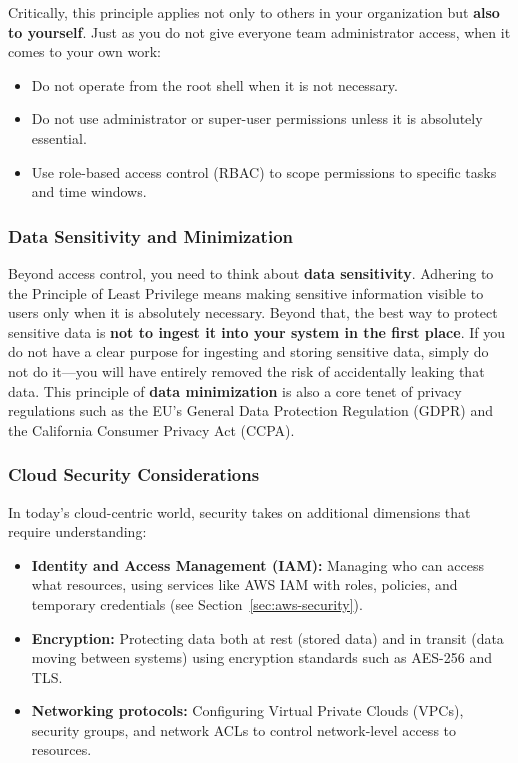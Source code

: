 \documentclass{article}
\begin{document}
Critically, this principle applies not only to others in your organization but \textbf{also to yourself}. Just as you do not give everyone team administrator access, when it comes to your own work:
\begin{itemize}
    \item Do not operate from the root shell when it is not necessary.
    \item Do not use administrator or super-user permissions unless it is absolutely essential.
    \item Use role-based access control (RBAC) to scope permissions to specific tasks and time windows.
\end{itemize}

\subsubsection{Data Sensitivity and Minimization}
Beyond access control, you need to think about \textbf{data sensitivity}. Adhering to the Principle of Least Privilege means making sensitive information visible to users only when it is absolutely necessary. Beyond that, the best way to protect sensitive data is \textbf{not to ingest it into your system in the first place}. If you do not have a clear purpose for ingesting and storing sensitive data, simply do not do it---you will have entirely removed the risk of accidentally leaking that data. This principle of \textbf{data minimization} is also a core tenet of privacy regulations such as the EU's General Data Protection Regulation (GDPR) \cite{gdpr2016} and the California Consumer Privacy Act (CCPA).

\subsubsection{Cloud Security Considerations}
In today's cloud-centric world, security takes on additional dimensions that require understanding:
\begin{itemize}
    \item \textbf{Identity and Access Management (IAM):} Managing who can access what resources, using services like AWS IAM with roles, policies, and temporary credentials (see Section~\ref{sec:aws-security}).
    \item \textbf{Encryption:} Protecting data both at rest (stored data) and in transit (data moving between systems) using encryption standards such as AES-256 and TLS.
    \item \textbf{Networking protocols:} Configuring Virtual Private Clouds (VPCs), security groups, and network ACLs to control network-level access to resources.
\end{itemize}
\end{document}
